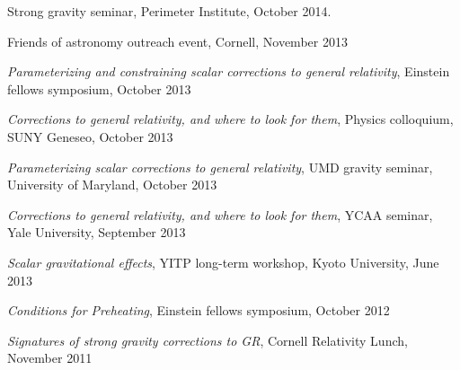 \begin{etaremune}
  Strong gravity seminar, Perimeter Institute, October 2014.
\item
  Friends of astronomy outreach event, Cornell, November 2013
\item
  {\it Parameterizing and constraining scalar corrections to general relativity},
  Einstein fellows symposium, October 2013
\item
  {\it Corrections to general relativity, and where to look for them},
  Physics colloquium, SUNY Geneseo, October 2013
\item
  {\it Parameterizing scalar corrections to general relativity},
  UMD gravity seminar,
  University of Maryland, October 2013
\item
  {\it Corrections to general relativity, and where to look for them},
  YCAA seminar, Yale University, September 2013
\item
  {\it Scalar gravitational effects},
  YITP long-term workshop, Kyoto University, June 2013
\item
  {\it Conditions for Preheating},
  Einstein fellows symposium, October 2012
\item
  {\it Signatures of strong gravity corrections to GR},
  Cornell Relativity Lunch, November 2011
\end{etaremune}

